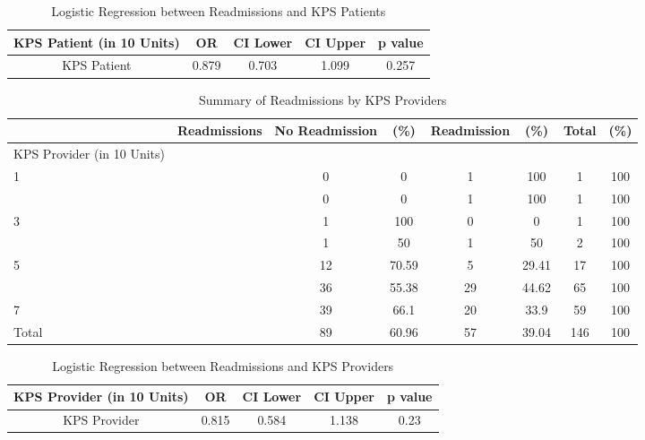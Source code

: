 \documentclass[12pt,]{article}
\begin{document}
\begin{table}[!h]

\caption{\label{tab:unnamed-chunk-21}Logistic Regression between Readmissions and KPS Patients}
\centering
\begin{tabular}{ccccc}
\toprule
KPS Patient (in 10 Units) & OR & CI Lower & CI Upper & p value\\
\midrule
\rowcolor{white}  KPS Patient & 0.879 & 0.703 & 1.099 & 0.257\\
\bottomrule
\end{tabular}
\end{table}

\pagebreak

\begin{table}[!h]

\caption{\label{tab:unnamed-chunk-22}Summary of Readmissions by KPS Providers}
\centering
\begin{tabular}{>{\centering\arraybackslash}p{5cm}ccccccc}
\toprule
  & Readmissions & No Readmission & (\%) & Readmission & (\%) & Total & (\%)\\
\midrule
KPS Provider (in 10 Units) &  &  &  &  &  &  & \\
\rowcolor[HTML]{E3E5E7}  1 &  & 0 & 0 & 1 & 100 & 1 & 100\\
2 &  & 0 & 0 & 1 & 100 & 1 & 100\\
\rowcolor[HTML]{E3E5E7}  3 &  & 1 & 100 & 0 & 0 & 1 & 100\\
4 &  & 1 & 50 & 1 & 50 & 2 & 100\\
\addlinespace
\rowcolor[HTML]{E3E5E7}  5 &  & 12 & 70.59 & 5 & 29.41 & 17 & 100\\
6 &  & 36 & 55.38 & 29 & 44.62 & 65 & 100\\
\rowcolor[HTML]{E3E5E7}  7 &  & 39 & 66.1 & 20 & 33.9 & 59 & 100\\
Total &  & 89 & 60.96 & 57 & 39.04 & 146 & 100\\
\bottomrule
\end{tabular}
\end{table}

\begin{table}[!h]

\caption{\label{tab:unnamed-chunk-22}Logistic Regression between Readmissions and KPS Providers}
\centering
\begin{tabular}{ccccc}
\toprule
KPS Provider (in 10 Units) & OR & CI Lower & CI Upper & p value\\
\midrule
\rowcolor{white}  KPS Provider & 0.815 & 0.584 & 1.138 & 0.23\\
\bottomrule
\end{tabular}
\end{table}
\end{document}
